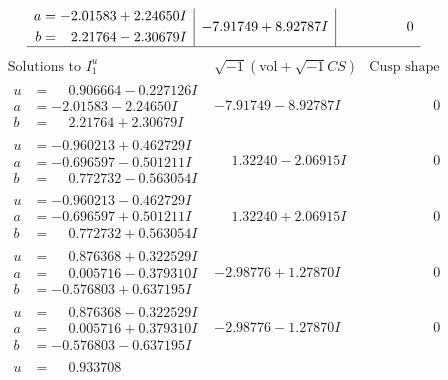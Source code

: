 \documentclass[1p]{elsarticle_modified}
\theoremstyle{definition}
\newcommand{\I}{\sqrt{-1}}
\begin{document}
$$\begin{array}{c|c|c}
\begin{aligned}
a &= -2.01583 + 2.24650 I \\
b &= \phantom{-}2.21764 - 2.30679 I\end{aligned}
 & -7.91749 + 8.92787 I & \phantom{-0.000000 } 0\\
 \hline 
 \end{array}$$\newpage$$\begin{array}{c|c|c}  
\text{Solutions to }I^u_{1}& \I (\text{vol} + \sqrt{-1}CS) & \text{Cusp shape}\\
 \hline 
\begin{aligned}
u &= \phantom{-}0.906664 - 0.227126 I \\
a &= -2.01583 - 2.24650 I \\
b &= \phantom{-}2.21764 + 2.30679 I\end{aligned}
 & -7.91749 - 8.92787 I & \phantom{-0.000000 } 0 \\ \hline\begin{aligned}
u &= -0.960213 + 0.462729 I \\
a &= -0.696597 - 0.501211 I \\
b &= \phantom{-}0.772732 - 0.563054 I\end{aligned}
 & \phantom{-}1.32240 - 2.06915 I & \phantom{-0.000000 } 0 \\ \hline\begin{aligned}
u &= -0.960213 - 0.462729 I \\
a &= -0.696597 + 0.501211 I \\
b &= \phantom{-}0.772732 + 0.563054 I\end{aligned}
 & \phantom{-}1.32240 + 2.06915 I & \phantom{-0.000000 } 0 \\ \hline\begin{aligned}
u &= \phantom{-}0.876368 + 0.322529 I \\
a &= \phantom{-}0.005716 - 0.379310 I \\
b &= -0.576803 + 0.637195 I\end{aligned}
 & -2.98776 + 1.27870 I & \phantom{-0.000000 } 0 \\ \hline\begin{aligned}
u &= \phantom{-}0.876368 - 0.322529 I \\
a &= \phantom{-}0.005716 + 0.379310 I \\
b &= -0.576803 - 0.637195 I\end{aligned}
 & -2.98776 - 1.27870 I & \phantom{-0.000000 } 0 \\ \hline\begin{aligned}
u &= \phantom{-}0.933708\phantom{ +0.000000I} \\

\end{aligned}
\end{array}$$
\end{document}
